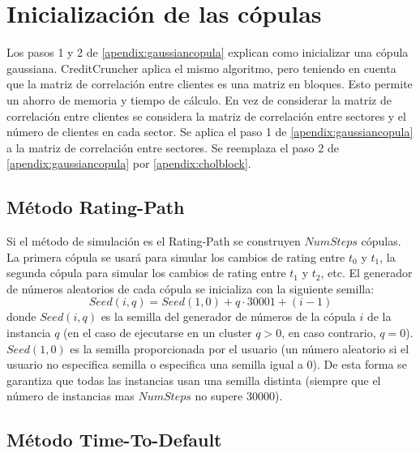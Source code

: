 \section{Inicializaci\'on de las c\'opulas}

Los pasos 1 y 2 de \ref{apendix:gaussiancopula} explican como
inicializar una c\'opula gaussiana. CreditCruncher aplica el 
mismo algoritmo, pero teniendo en cuenta que la matriz de
correlaci\'on entre clientes es una matriz en bloques. Esto
permite un ahorro de memoria y tiempo de c\'alculo. En vez de
considerar la matriz de correlaci\'on entre clientes se
considera la matriz de correlaci\'on entre sectores y el
n\'umero de clientes en cada sector. Se aplica el paso 1
de \ref{apendix:gaussiancopula} a la matriz de correlaci\'on
entre sectores. Se reemplaza el paso 2 de \ref{apendix:gaussiancopula}
por \ref{apendix:cholblock}.


\subsection{M\'etodo Rating-Path}

Si el m\'etodo de simulaci\'on es el Rating-Path se construyen
$NumSteps$ c\'opulas. La primera c\'opula se usar\'a para simular
los cambios de rating entre $t_0$ y $t_1$, la segunda c\'opula
para simular los cambios de rating entre $t_1$ y $t_2$, etc.
\newline
\newline
El generador de n\'umeros aleatorios de cada c\'opula se
inicializa con la siguiente semilla:
\begin{displaymath}
Seed(i,q) = Seed(1,0) + q \cdot 30001 + (i-1)
\end{displaymath}
donde $Seed(i,q)$ es la semilla del generador de n\'umeros de la
c\'opula $i$ de la instancia $q$ (en el caso de ejecutarse en un
cluster $q>0$, en caso contrario, $q=0$). $Seed(1,0)$ es la semilla
proporcionada por el usuario (un n\'umero aleatorio si el usuario no
especifica semilla o especifica una semilla igual a 0). De esta
forma se garantiza que todas las instancias usan una semilla distinta
(siempre que el n\'umero de instancias mas $NumSteps$ no supere 30000).

\subsection{M\'etodo Time-To-Default}

